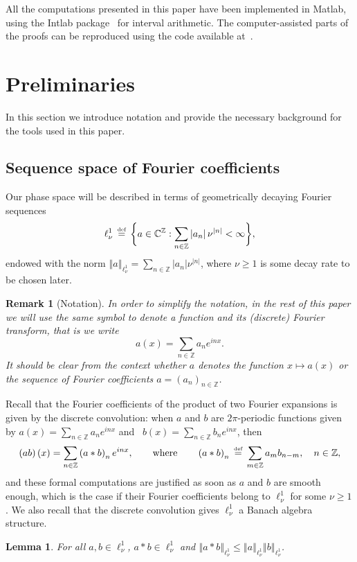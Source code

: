 \documentclass[10pt,a4paper]{article}
\theoremstyle{plain}
\newtheorem{lemma}[theorem]{Lemma}
\newtheorem{remark}[theorem]{Remark}
\newcommand{\ZZ}{\mathbb Z}
\newcommand{\CC}{\mathbb C}
\newcommand{\1}{\mathbf{1}}
\newcommand{\bydef}{\,\stackrel{\mbox{\tiny\textnormal{\raisebox{0ex}[0ex][0ex]{def}}}}{=}\,}
\begin{document}
All the computations presented in this paper have been implemented in Matlab,
using the Intlab package~\cite{Rum99} for interval arithmetic. The computer-assisted
parts of the proofs can be reproduced using the code available at~\cite{integratorcode_new}.
\section{Preliminaries}
\label{sec:preliminaries}
In this section we introduce notation and provide the necessary background for the tools
used in this paper. 

\subsection{Sequence space of Fourier coefficients}
\label{sec:preliminaries_Fourier}
Our phase space will be described in terms of geometrically decaying Fourier sequences
\begin{align*}
	\ell^{1}_{\nu} \bydef  \biggl\{ a \in \CC^{\ZZ} : 
				\sum_{n\in\ZZ} \left \vert a_{n} \right \vert \nu^{\vert n\vert} < \infty \biggr\} ,
\end{align*}
endowed with the norm 
$\left \Vert a \right \Vert_{\ell^1_\nu} = 
\sum_{n\in\ZZ}  \left \vert a_{n} \right \vert \nu^{\vert n\vert}$,
where $\nu\geq 1$ is some decay rate to be chosen later. 
%
\begin{remark}[Notation]
\label{rem:identification}
In order to simplify the notation, in the rest of this paper we will use the same symbol to denote a function and its (discrete) Fourier transform, that is we write
\begin{equation*}
a(x) = \sum_{n\in\ZZ} a_{n} e^{inx}.
\end{equation*}
It should be clear from the context whether $a$ denotes the function $x\mapsto a(x)$ or the sequence of Fourier coefficients $a=\left(a_n\right)_{n\in\ZZ}$.
\end{remark}
%
Recall that the Fourier coefficients of the product of two Fourier expansions is given by
the discrete convolution: when $a$ and $b$ are $2\pi$-periodic functions given by
$a(x) = \sum_{n\in\ZZ} a_{n} e^{inx}$
and \
$b(x) = \sum_{n\in\ZZ} b_{n} e^{inx}$,
then
\begin{align*}
	\left( ab \right) (x) = 
	 \sum_{n\in\ZZ} \left( a \ast b\right)_{n} e^{inx},  
\qquad\text{where}\qquad
	\left(  a \ast b \right)_{n} \bydef  \sum_{m \in \ZZ}  a_m b_{n-m},
	\quad n \in \ZZ,
\end{align*}
and these formal computations are justified as soon as $a$ and $b$ are smooth enough, which is the case if their Fourier coefficients belong to $\ell^1_\nu$ for some $\nu\geq 1$. We also recall that the discrete convolution gives $\ell^{1}_{\nu}$ a Banach algebra structure.
\begin{lemma}
	\label{lem:BanachAlgebra}
For all $a,b\in\ell^1_\nu$, $a\ast b \in\ell^1_\nu$ and
$\left \Vert a\ast b \right \Vert_{\ell^1_\nu} \leq \left \Vert a \right \Vert_{\ell^1_\nu} \left \Vert b \right \Vert_{\ell^1_\nu}$.
\end{lemma}
\end{document}
